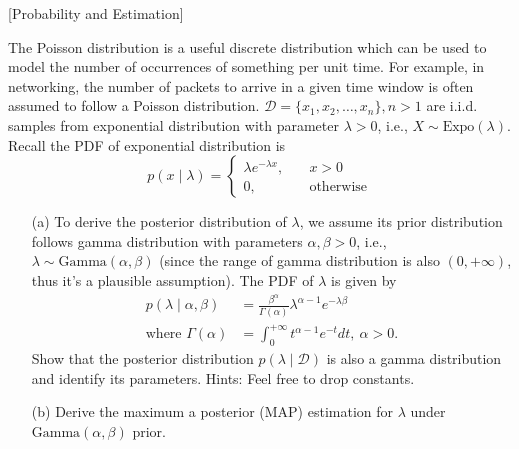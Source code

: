 \item {} [Probability and Estimation]

The Poisson distribution is a useful discrete distribution which can be used to model the number of occurrences of something per unit time. For example, in networking, the number of packets to arrive in a given time window is often assumed to follow a Poisson distribution.
$\mathcal{D}=\{ x_{1}, x_{2}, \ldots, x_{n} \}, n>1$ are i.i.d. samples from exponential distribution with parameter $\lambda > 0$, i.e., $X \sim \text{Expo}(\lambda)$. Recall the PDF of exponential distribution is
$$p(x\mid \lambda) = \begin{cases}
\lambda e^{-\lambda x},&\quad x > 0 \\
0,&\quad \text{otherwise}
\end{cases}$$

\begin{itemize}
\item[(a)] To derive the posterior distribution of $\lambda$, we assume its prior distribution follows gamma distribution with parameters $\alpha,\beta > 0$, i.e., $\lambda \sim\text{Gamma}(\alpha,\beta)$ (since the range of gamma distribution is also $(0,+\infty)$, thus it's a plausible assumption). The PDF of $\lambda$ is given by
\begin{align*}
p(\lambda\mid \alpha,\beta) &= \frac{\beta^{\alpha}}{\Gamma(\alpha)} \lambda^{\alpha-1}e^{-\lambda\beta} \\
\text{where \ \ \ \ } \Gamma(\alpha) &= \int_{0}^{+\infty} t^{\alpha-1}e^{-t}dt,\ \alpha>0.
\end{align*}
Show that the posterior distribution $p(\lambda\mid \mathcal{D})$ is also a gamma distribution and identify its parameters. Hints: Feel free to drop constants. 

\item[(b)] Derive the maximum a posterior (MAP) estimation for $\lambda$ under $\text{Gamma}(\alpha,\beta)$ prior. 

\end{itemize}

\solution















\newpage